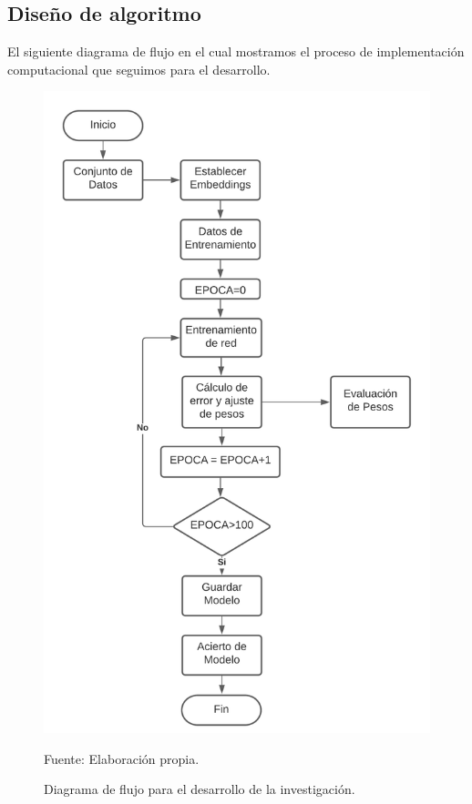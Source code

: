 \newpage

\subsection{Diseño de algoritmo}

El siguiente diagrama de flujo en el cual mostramos el proceso de implementación computacional que seguimos para el desarrollo.

\begin{figure}[H]
	\centering
		\includegraphics[scale=0.7]{imagenes/flujograma.png}
		\caption{Diagrama de flujo para el desarrollo de la investigación.}
	\begin{center}
    Fuente: Elaboración propia.
    \end{center}
	\label{fig:39}
\end{figure}

